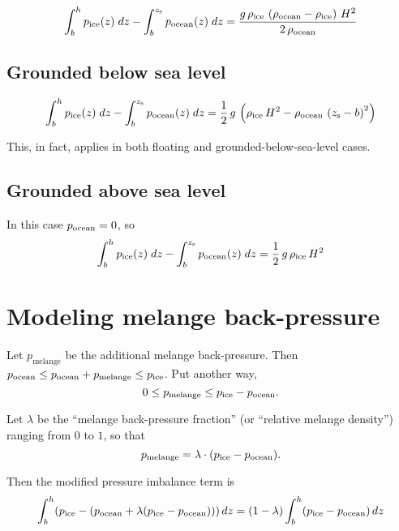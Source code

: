 \documentclass[11pt]{article}
\begin{document}
\begin{equation*}
\int_{b}^{h}{p_{\text{ice}}(z)\; dz}-\int_{b}^{z_{\text{s}}}{p_{\text{ocean}}(z)\; dz}=
 \frac{g\, \rho_{\text{ice}}\, \left(\rho_{\text{ocean}}-\rho_{\text{ice}}\right)\, H^2}{2\, \rho_{\text{ocean}}}
\end{equation*}

\subsection{Grounded below sea level}
\label{sec-5-2}

\begin{equation*}
\int_{b}^{h}{p_{\text{ice}}(z)\; dz}-\int_{b}^{z_{\text{s}}}{p_{\text{ocean}}(z)\; dz}=
 \frac{1}{2}\, g\, \left(\rho_{\text{ice}}\, H^2-\rho_{\text{ocean}}\, \left(z_{\text{s}}-b\right)^2\right)
\end{equation*}

This, in fact, applies in both floating and grounded-below-sea-level
cases.

\subsection{Grounded above sea level}
\label{sec-5-3}

In this case $p_{\text{ocean}} = 0$, so
\begin{equation*}
\int_{b}^{h}{p_{\text{ice}}(z)\; dz}-\int_{b}^{z_{\text{s}}}{p_{\text{ocean}}(z)\; dz}=\frac{1}{2}\, g\, \rho_{\text{ice}}\, H^2
\end{equation*}

\section{Modeling melange back-pressure}
\label{sec-6}

\newcommand{\pmelange}{p_{\text{melange}}}
Let $\pmelange$ be the additional melange back-pressure. Then $\psw \le \psw +
\pmelange \le \pice$. Put another way,
\begin{equation}
\label{eq:13}
0 \le \pmelange \le \pice - \psw.
\end{equation}

Let $\lambda$ be the ``melange back-pressure fraction'' (or ``relative
melange density'') ranging from $0$ to $1$, so that
\begin{equation}
\label{eq:14}
\pmelange = \lambda \cdot (\pice - \psw).
\end{equation}

Then the modified pressure imbalance term is
\begin{equation}
\label{eq:15}
\int_{b}^{h}(p_{\text{ice}} - (p_{\text{ocean}} + \lambda(p_{\text{ice}} - p_{\text{ocean}})))\, dz = (1 - \lambda) \int_{b}^{h} (p_{\text{ice}} - p_{\text{ocean}})\, dz
\end{equation}
\end{document}
